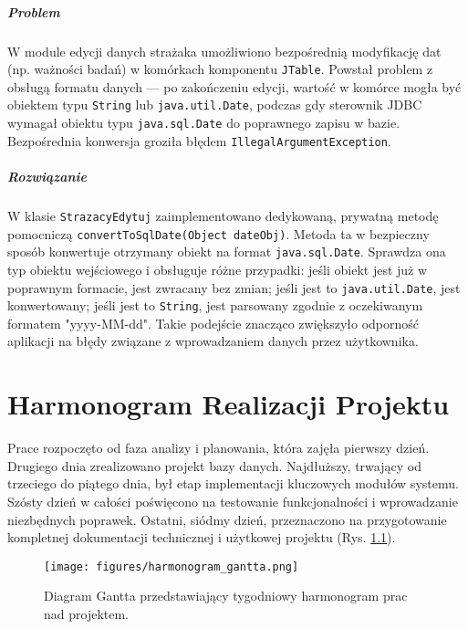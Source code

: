 \paragraph{Problem} W module edycji danych strażaka umożliwiono bezpośrednią modyfikację dat (np. ważności badań) w komórkach komponentu \texttt{JTable}. Powstał problem z obsługą formatu danych — po zakończeniu edycji, wartość w komórce mogła być obiektem typu \texttt{String} lub \texttt{java.util.Date}, podczas gdy sterownik JDBC wymagał obiektu typu \texttt{java.sql.Date} do poprawnego zapisu w bazie. Bezpośrednia konwersja groziła błędem \texttt{IllegalArgumentException}.

\paragraph{Rozwiązanie} W klasie \texttt{StrazacyEdytuj} zaimplementowano dedykowaną, prywatną metodę pomocniczą \texttt{convertToSqlDate(Object dateObj)}. Metoda ta w bezpieczny sposób konwertuje otrzymany obiekt na format \texttt{java.sql.Date}. Sprawdza ona typ obiektu wejściowego i obsługuje różne przypadki: jeśli obiekt jest już w poprawnym formacie, jest zwracany bez zmian; jeśli jest to \texttt{java.util.Date}, jest konwertowany; jeśli jest to \texttt{String}, jest parsowany zgodnie z oczekiwanym formatem "yyyy-MM-dd". Takie podejście znacząco zwiększyło odporność aplikacji na błędy związane z wprowadzaniem danych przez użytkownika.


\chapter{Harmonogram Realizacji Projektu}
\label{chap:harmonogram}
Prace rozpoczęto od faza analizy i planowania, która zajęła pierwszy dzień. Drugiego dnia zrealizowano projekt bazy danych. Najdłuższy, trwający od trzeciego do piątego dnia, był etap implementacji kluczowych modułów systemu. Szósty dzień w całości poświęcono na testowanie funkcjonalności i wprowadzanie niezbędnych poprawek. Ostatni, siódmy dzień, przeznaczono na przygotowanie kompletnej dokumentacji technicznej i użytkowej projektu (Rys. \ref{fig:harmonogram_gantta}).

\begin{figure}[H]
    \centering
    \texttt{[image: figures/harmonogram\_gantta.png]}
    \caption{Diagram Gantta przedstawiający tygodniowy harmonogram prac nad projektem.}
    \label{fig:harmonogram_gantta}
\end{figure}